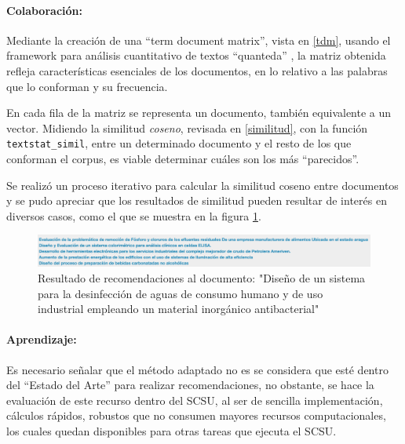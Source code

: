 \documentclass[
  12pt,
  openany]{book}
\begin{document}
\hypertarget{colaboraciuxf3n-5}{%
\paragraph{Colaboración:}\label{colaboraciuxf3n-5}}

Mediante la creación de una ``term document matrix'', vista en \ref{tdm}, usando el framework para análisis cuantitativo de textos ``quanteda'' \citep{quanteda}, la matriz obtenida refleja características esenciales de los documentos, en lo relativo a las palabras que lo conforman y su frecuencia.

En cada fila de la matriz se representa un documento, también equivalente a un vector. Midiendo la similitud \emph{coseno}, revisada en \ref{similitud}, con la función \texttt{textstat\_simil}, entre un determinado documento y el resto de los que conforman el corpus, es viable determinar cuáles son los más ``parecidos''.

Se realizó un proceso iterativo para calcular la similitud coseno entre documentos y se pudo apreciar que los resultados de similitud pueden resultar de interés en diversos casos, como el que se muestra en la figura \ref{fig:similitudreco}.

\begin{figure}

{\centering \includegraphics[width=0.9\linewidth]{images/05-desarrollo/2_ciclo/similitud_reco2} 

}

\caption{Resultado de recomendaciones al documento: "Diseño de un sistema para la desinfección de aguas de consumo humano y de uso industrial empleando un material inorgánico antibacterial"}\label{fig:similitudreco}
\end{figure}

\hypertarget{aprendizaje-1}{%
\paragraph{Aprendizaje:}\label{aprendizaje-1}}

Es necesario señalar que el método adaptado no es se considera que esté dentro del ``Estado del Arte'' para realizar recomendaciones, no obstante, se hace la evaluación de este recurso dentro del SCSU, al ser de sencilla implementación, cálculos rápidos, robustos que no consumen mayores recursos computacionales, los cuales quedan disponibles para otras tareas que ejecuta el SCSU.
\end{document}
